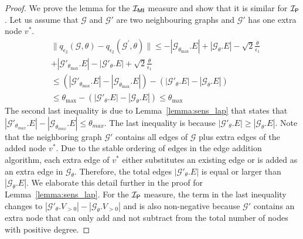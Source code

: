 \begin{proof}
We prove the lemma for the $\mathcal{I_{\mathsf{MI}}}$ measure and show that it is similar for $\mathcal{I_\mathsf{P}}$. Let us assume that $\mathcal{G}$ and $\mathcal{G}'$ are two neighbouring graphs and $\mathcal{G}'$ has one extra node $v^*$. 
    \begin{equation*}
        \begin{split}
            &\|q_{\epsilon_2}(\mathcal{G}, \theta) - q_{\epsilon_2}(\mathcal{G}^\prime, \theta)\| \leq -|\mathcal{G}_{\theta_{\max}}.E| + |\mathcal{G}_{\theta}.E| - \sqrt{2}\frac{\theta}{\epsilon_1} \\ &+ |\mathcal{G}'_{\theta_{\max}}.E| - |\mathcal{G}'_{\theta}.E| + \sqrt{2}\frac{\theta}{\epsilon_1} \\
            &\leq \left(|\mathcal{G}'_{\theta_{\max}}.E| - |\mathcal{G}_{\theta_{\max}}.E|\right) - \left(|\mathcal{G}'_\theta.E| - |\mathcal{G}_\theta.E|\right)\\
            &\leq \theta_{\max} - \left(|\mathcal{G}'_\theta.E| - |\mathcal{G}_\theta.E|\right) 
            \leq \theta_{\max}    
        \end{split}
    \end{equation*}
    The second last inequality is due to Lemma~\ref{lemma:sens_lap} that states that $|\mathcal{G}'_{\theta_{max}}.E| - |\mathcal{G}_{\theta_{max}}.E| \leq \theta_{max}$. The last inequality is because $|\mathcal{G}'_\theta.E| \geq |\mathcal{G}_\theta.E|$. Note that the neighboring graph $\mathcal{G}'$ contains all edges of $\mathcal{G}$ plus extra edges of the added node $v^*$. Due to the stable ordering of edges in the edge addition algorithm, each extra edge of $v^*$ either substitutes an existing edge or is added as an extra edge in $\mathcal{G}_\theta$. Therefore, the total edges $|\mathcal{G}'_\theta.E|$ is equal or larger than $|\mathcal{G}_\theta.E|$. We elaborate this detail further in the proof for Lemma~\ref{lemma:sens_lap}. For the $\mathcal{I_\mathsf{P}}$ measure, the term in the last inequality changes to $|\mathcal{G}'_\theta.V_{>0}| - |\mathcal{G}_\theta.V_{>0}|$ and is also non-negative because $\mathcal{G}'$ contains an extra node that can only add and not subtract from the total number of nodes with positive degree.
\end{proof}

